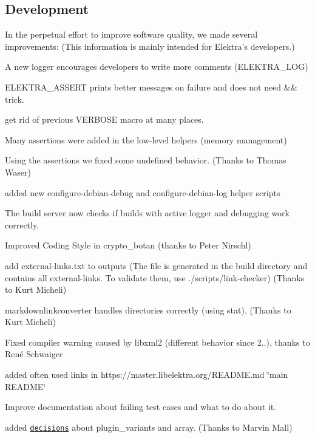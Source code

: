 \subsection*{Development}

In the perpetual effort to improve software quality, we made several improvements\+: (This information is mainly intended for Elektra’s developers.)


\begin{DoxyItemize}
\item A new logger encourages developers to write more comments ({\ttfamily E\+L\+E\+K\+T\+R\+A\+\_\+\+L\+OG})
\item {\ttfamily E\+L\+E\+K\+T\+R\+A\+\_\+\+A\+S\+S\+E\+RT} prints better messages on failure and does not need {\ttfamily \&\&} trick.
\item get rid of previous {\ttfamily V\+E\+R\+B\+O\+SE} macro at many places.
\item Many assertions were added in the low-\/level helpers (memory management)
\item Using the assertions we fixed some undefined behavior. (Thanks to Thomas Waser)
\item added new {\ttfamily configure-\/debian-\/debug} and {\ttfamily configure-\/debian-\/log} helper scripts
\item The build server now checks if builds with active logger and debugging work correctly.
\item Improved Coding Style in crypto\+\_\+botan (thanks to Peter Nirschl)
\item add {\ttfamily external-\/links.\+txt} to {\ttfamily outputs} (The file is generated in the build directory and contains all external-\/links. To validate them, use {\ttfamily ./scripts/link-\/checker}) (Thanks to Kurt Micheli)
\item {\ttfamily markdownlinkconverter} handles directories correctly (using {\ttfamily stat}). (Thanks to Kurt Micheli)
\item Fixed compiler warning caused by libxml2 (different behavior since 2..), thanks to René Schwaiger
\item added often used links in https\+://master.libelektra.\+org/\+R\+E\+A\+D\+ME.md \char`\"{}main R\+E\+A\+D\+M\+E\char`\"{}
\item Improve documentation about failing test cases and what to do about it.
\item added \href{https://master.libelektra.org/doc/decisions/}{\tt decisions} about {\ttfamily plugin\+\_\+variants} and {\ttfamily array}. (Thanks to Marvin Mall)

\end{DoxyItemize}
